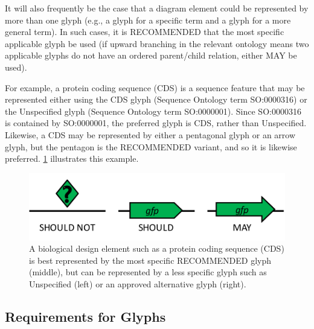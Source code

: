 It will also frequently be the case that a diagram element could be represented by more than one glyph (e.g., a glyph for a specific term and a glyph for a more general term).
In such cases, it is RECOMMENDED that the most specific applicable glyph be used
(if upward branching in the relevant ontology means two applicable glyphs do not have an ordered parent/child relation, either MAY be used).

For example, a protein coding sequence (CDS) is a sequence feature that may be represented either using the CDS glyph (Sequence Ontology term SO:0000316) or the Unspecified glyph (Sequence Ontology term SO:0000001).  
Since SO:0000316 is contained by SO:0000001, the preferred glyph is CDS, rather than Unspecified.
Likewise, a CDS may be represented by either a pentagonal glyph or an arrow glyph, but the pentagon is the RECOMMENDED variant, and so it is likewise preferred.  
\ref{f:glyphalternatives} illustrates this example.

\begin{figure}[h!]
\centering
\includegraphics[scale=0.6]{figures/glyphalternatives.pdf}
\caption{A biological design element such as a protein coding sequence (CDS) is best represented by the most specific RECOMMENDED glyph (middle), but can be represented by a less specific glyph such as Unspecified (left) or an approved alternative glyph (right).}
\label{f:glyphalternatives}
\end{figure}

\subsection{Requirements for Glyphs}

